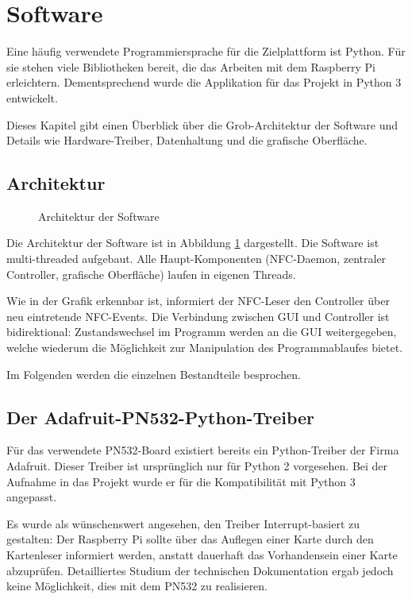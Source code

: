 \documentclass[11pt,a4paper]{IEEEtran}
\begin{document}
\section{Software} 
\label{sec:sw}

Eine häufig verwendete Programmiersprache für die Zielplattform ist Python. Für
sie stehen viele Bibliotheken bereit, die das Arbeiten mit dem Raspberry Pi 
erleichtern. Dementsprechend wurde die Applikation für das Projekt in Python 3
entwickelt.

Dieses Kapitel gibt einen Überblick über die Grob-Architektur der Software und
Details wie Hardware-Treiber, Datenhaltung und die grafische Oberfläche.

\subsection{Architektur}

\begin{figure}[htb]
    \label{fig:arch}
    \centering
    
    \caption{Architektur der Software}
\end{figure}

Die Architektur der Software ist in Abbildung \ref{fig:arch} dargestellt. Die
Software ist multi-threaded aufgebaut. Alle Haupt-Komponenten (NFC-Daemon,
zentraler Controller, grafische Oberfläche) laufen in eigenen Threads. 

Wie in der Grafik erkennbar ist, informiert der NFC-Leser den Controller über
neu eintretende NFC-Events. Die Verbindung zwischen GUI und Controller ist
bidirektional: Zustandswechsel im Programm werden an die GUI weitergegeben, 
welche wiederum die Möglichkeit zur Manipulation des Programmablaufes bietet.

Im Folgenden werden die einzelnen Bestandteile besprochen.

\subsection{Der Adafruit-PN532-Python-Treiber} 

Für das verwendete PN532-Board existiert bereits ein Python-Treiber der Firma
Adafruit\autocite{AdafruitPN532}. Dieser Treiber ist ursprünglich nur für Python
2 vorgesehen. Bei der Aufnahme in das Projekt wurde er für die Kompatibilität
mit Python 3 angepasst.

Es wurde als wünschenswert angesehen, den Treiber Interrupt-basiert zu
gestalten: Der Raspberry Pi sollte über das Auflegen einer Karte durch den
Kartenleser informiert werden, anstatt dauerhaft das Vorhandensein einer Karte
abzuprüfen. Detailliertes Studium der technischen
Dokumentation\autocite{Pn532Manual} ergab jedoch keine Möglichkeit, dies mit
dem PN532 zu realisieren. 
\end{document}
